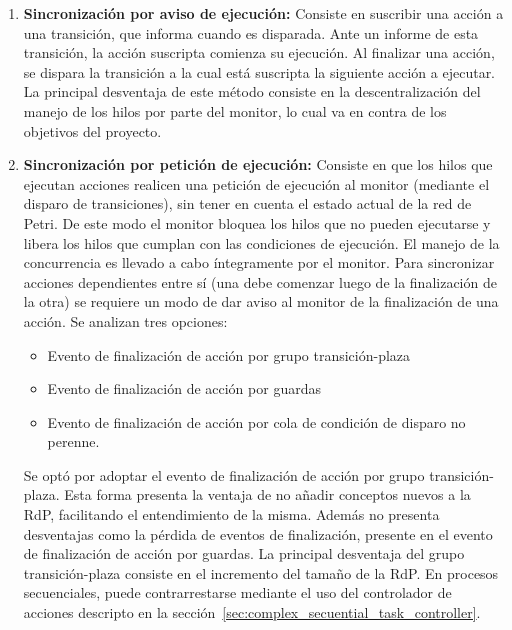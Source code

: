 \begin{enumerate}
  \item \textbf{Sincronización por aviso de ejecución: } Consiste en suscribir
  una acción a una transición, que informa cuando es disparada. Ante un informe
  de esta transición, la acción suscripta comienza su ejecución.
  Al finalizar una acción, se dispara la transición a la cual está suscripta la
  siguiente acción a ejecutar.
  La principal desventaja de este método consiste en la descentralización del
  manejo de los hilos por parte del monitor, lo cual va en contra de los objetivos del
  proyecto.
  \item \textbf{Sincronización por petición de ejecución: } Consiste en que los
  hilos que ejecutan acciones realicen una petición de ejecución al
  monitor (mediante el disparo de transiciones), sin tener en cuenta el estado
  actual de la red de Petri. De este modo el monitor bloquea los hilos que no
  pueden ejecutarse y libera los hilos que cumplan con las condiciones de
  ejecución. El manejo de la concurrencia es llevado a cabo íntegramente por el
  monitor.
  Para sincronizar acciones dependientes entre sí (una debe comenzar luego de
  la finalización de la otra) se requiere un modo de dar aviso al monitor de
  la finalización de una acción. Se analizan tres opciones:
  \begin{itemize}
      \item Evento de finalización de acción por grupo transición-plaza
	  \item Evento de finalización de acción por guardas
	  \item Evento de finalización de acción por cola de condición de disparo no
	  perenne.
  \end{itemize}
  Se optó por adoptar el evento de finalización de acción por grupo
  transición-plaza. Esta forma presenta la ventaja de no añadir
  conceptos nuevos a la RdP, facilitando el entendimiento de la misma. Además
  no presenta desventajas como la pérdida de eventos de finalización, presente
  en el evento de finalización de acción por guardas.
  La principal desventaja del grupo transición-plaza consiste en el incremento
  del tamaño de la RdP. En procesos secuenciales, puede contrarrestarse mediante
  el uso del controlador de acciones descripto en la
  sección~\ref{sec:complex_secuential_task_controller}.
\end{enumerate}
 

 
 
 
 
